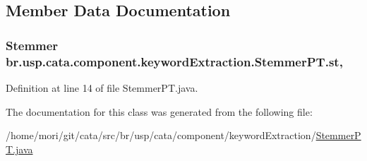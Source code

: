 \subsection{Member Data Documentation}
\hypertarget{classbr_1_1usp_1_1cata_1_1component_1_1keyword_extraction_1_1_stemmer_p_t_a92bb2f6d92560e50b27878c73890dc92}{
\subsubsection[{st}]{\setlength{\rightskip}{0pt plus 5cm}Stemmer br.\+usp.\+cata.\+component.\+keyword\+Extraction.\+Stemmer\+P\+T.\+st\hspace{0.3cm}{\ttfamily [static]}, {\ttfamily [private]}}}\label{classbr_1_1usp_1_1cata_1_1component_1_1keyword_extraction_1_1_stemmer_p_t_a92bb2f6d92560e50b27878c73890dc92}


Definition at line 14 of file Stemmer\+P\+T.\+java.



The documentation for this class was generated from the following file\+:\begin{DoxyCompactItemize}
\item 
/home/mori/git/cata/src/br/usp/cata/component/keyword\+Extraction/\hyperlink{_stemmer_p_t_8java}{Stemmer\+P\+T.\+java}\end{DoxyCompactItemize}
